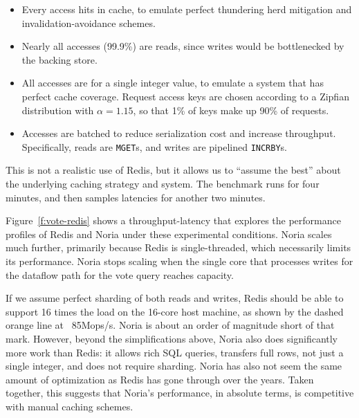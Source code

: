 \begin{itemize}
 \item Every access hits in cache, to emulate perfect thundering herd mitigation
   and invalidation-avoidance schemes.
 \item Nearly all accesses (99.9\%) are reads, since writes would be
   bottlenecked by the backing store.
 \item All accesses are for a single integer value, to emulate a system that has
   perfect cache coverage. Request access keys are chosen according to a Zipfian
    distribution with $\alpha = 1.15$, so that 1\% of keys make up 90\% of
    requests.
 \item Accesses are batched to reduce serialization cost and increase
   throughput. Specifically, reads are \texttt{MGET}s, and writes are pipelined
    \texttt{INCRBY}s.
\end{itemize}

This is not a realistic use of Redis, but it allows us to ``assume the best''
about the underlying caching strategy and system. The benchmark runs for four
minutes, and then samples latencies for another two minutes.

Figure~\ref{f:vote-redis} shows a throughput-latency that explores the
performance profiles of Redis and Noria under these experimental conditions.
Noria scales much further, primarily because Redis is single-threaded, which
necessarily limits its performance. Noria stops scaling when the single core
that processes writes for the dataflow path for the vote query reaches capacity.

If we assume perfect sharding of both reads and writes, Redis should be able to
support 16 times the load on the 16-core host machine, as shown by the dashed
orange line at ~85Mops/s. Noria is about an order of magnitude short of that
mark. However, beyond the simplifications above, Noria also does significantly
more work than Redis: it allows rich SQL queries, transfers full rows, not just
a single integer, and does not require sharding. Noria has also not seem the
same amount of optimization as Redis has gone through over the years. Taken
together, this suggests that Noria's performance, in absolute terms, is
competitive with manual caching schemes.
